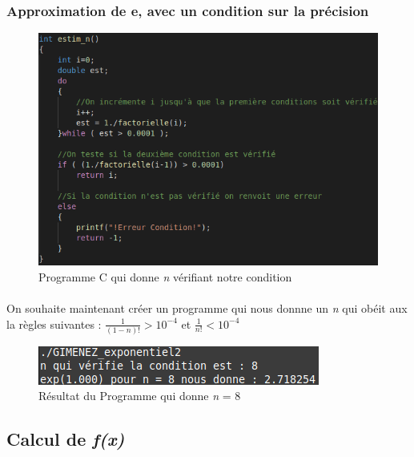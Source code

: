 \documentclass[10pt,a4paper]{article}
\begin{document}
\subsubsection{Approximation de e, avec un condition sur la précision}
\begin{figure}[h]
\begin{center}
\includegraphics[scale=.3]{images/expo_2_c}
\end{center}
\caption{Programme C qui donne \emph{n} vérifiant notre condition}
\end{figure}
\paragraph{}
On souhaite maintenant créer un programme qui nous donnne un \emph{n} qui obéit aux la règles suivantes : 
$\frac{1}{(1-n)!} > 10^{-4}$ et $\frac{1}{n!} < 10^{-4}$ 
\begin{figure}[h]
\begin{center}
\includegraphics[scale=.3]{images/expo2_ex}
\end{center}
\caption{Résultat du Programme qui donne \emph{n} = 8}
\end{figure}

\subsection{Calcul de \emph{f(x)}}
\end{document}
